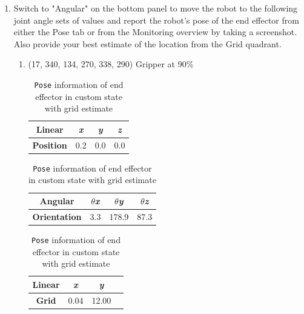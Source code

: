 \documentclass[12pt]{article}
\begin{document}
\begin{enumerate}
    \item Switch to "Angular" on the bottom panel to move the robot to the following joint angle sets of values and report the robot’s pose of the end effector from either the Pose tab or from the Monitoring overview by taking a screenshot. Also provide your best estimate of the location from the Grid quadrant.
    
    \begin{enumerate}

    \item (17, 340, 134, 270, 338, 290) Gripper at 90\%
    
    \begin{table}[H]
        \caption{\texttt{Pose} information of end effector in custom state with grid estimate}
        \begin{subtable}{.3\linewidth}
            \centering
            \begin{tabular}{cccc}
                \toprule
                \textbf{Linear} & \textit{x} & \textit{y} & \textit{z} \\\midrule
                \textbf{Position} & 0.2 & 0.0 & 0.0 \\\bottomrule
            \end{tabular}
        \end{subtable}
        \hfill
        \begin{subtable}{.4\linewidth}
            \centering
            \begin{tabular}{cccc}
                \toprule
                \textbf{Angular} & \textit{$\theta$x} & \textit{$\theta$y} & \textit{$\theta$z} \\\midrule
                \textbf{Orientation} & 3.3 & 178.9 & 87.3 \\\bottomrule
            \end{tabular}
        \end{subtable}
        \hfill
        \begin{subtable}{.25\linewidth}
            \centering
            \begin{tabular}{cccc}
                \toprule
                \textbf{Linear} & \textit{x} & \textit{y} \\\midrule
                \textbf{Grid} & 0.04 & 12.00 \\\bottomrule
            \end{tabular}
        \end{subtable}
    \end{table}
    

\end{enumerate}
\end{enumerate}
\end{document}
